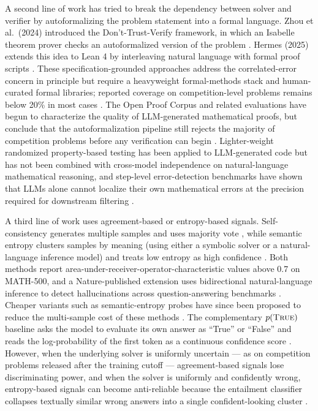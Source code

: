 \documentclass[11pt]{article}
\begin{document}
A second line of work has tried to break the dependency between solver and verifier by autoformalizing the problem statement into a formal language. Zhou et al.\ (2024) introduced the Don't-Trust-Verify framework, in which an Isabelle theorem prover checks an autoformalized version of the problem \citep{dtv2024}. Hermes (2025) extends this idea to Lean 4 by interleaving natural language with formal proof scripts \citep{hermes2025}. These specification-grounded approaches address the correlated-error concern in principle but require a heavyweight formal-methods stack and human-curated formal libraries; reported coverage on competition-level problems remains below 20\% in most cases \citep{dtv2024, hermes2025}. The Open Proof Corpus and related evaluations have begun to characterize the quality of LLM-generated mathematical proofs, but conclude that the autoformalization pipeline still rejects the majority of competition problems before any verification can begin \citep{openproof2025}. Lighter-weight randomized property-based testing has been applied to LLM-generated code \citep{pgs2025, quickcheck2000} but has not been combined with cross-model independence on natural-language mathematical reasoning, and step-level error-detection benchmarks have shown that LLMs alone cannot localize their own mathematical errors at the precision required for downstream filtering \citep{cannotspot2025, processbench2024}.

A third line of work uses agreement-based or entropy-based signals. Self-consistency generates multiple samples and uses majority vote \citep{wang2023selfconsistency}, while semantic entropy clusters samples by meaning (using either a symbolic solver or a natural-language inference model) and treats low entropy as high confidence \citep{kuhn2023semantic, farquhar2024nature}. Both methods report area-under-receiver-operator-characteristic values above 0.7 on MATH-500, and a Nature-published extension uses bidirectional natural-language inference to detect hallucinations across question-answering benchmarks \citep{kuhn2023semantic, farquhar2024nature, wang2023selfconsistency}. Cheaper variants such as semantic-entropy probes have since been proposed to reduce the multi-sample cost of these methods \citep{seprobes2024}. The complementary $p(\textsc{True})$ baseline asks the model to evaluate its own answer as ``True'' or ``False'' and reads the log-probability of the first token as a continuous confidence score \citep{kadavath2022}. However, when the underlying solver is uniformly uncertain --- as on competition problems released after the training cutoff --- agreement-based signals lose discriminating power, and when the solver is uniformly and confidently wrong, entropy-based signals can become anti-reliable because the entailment classifier collapses textually similar wrong answers into a single confident-looking cluster \citep{wu2025contam, kuhn2023semantic, farquhar2024nature}.
\end{document}
